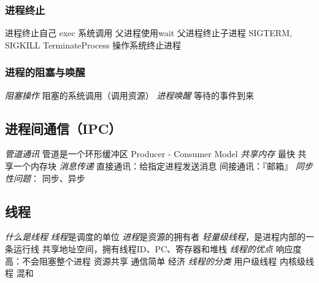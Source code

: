 \documentclass{ctexart}
\begin{document}
\subsubsection{进程终止}
\begin{outline}
    \1 进程终止自己 exec 系统调用
        \2 父进程使用wait
    \1 父进程终止子进程
        \2 SIGTERM, SIGKILL
        \2 TerminateProcess
    \1 操作系统终止进程
\end{outline}
\subsubsection{进程的阻塞与唤醒}
\begin{outline}
    \1 \emph{阻塞操作} 阻塞的系统调用（调用资源）
    \1 \emph{进程唤醒} 等待的事件到来
\end{outline}
\subsection{进程间通信（IPC）}
\begin{outline}
    \1 \emph{管道通讯}
        \2 管道是一个环形缓冲区
        \2 Producer - Consumer Model
    \1 \emph{共享内存}
        \2 最快
        \2 共享一个内存块
    \1 \emph{消息传递}
        \2 直接通讯：给指定进程发送消息
        \2 间接通讯：『邮箱』
    \1 \emph{同步性问题}： 同步、异步
\end{outline}
\subsection{线程}
\begin{outline}
    \1 \emph{什么是线程}
        \2 \emph{线程}是调度的单位
        \2 \emph{进程}是资源的拥有者
        \2 \emph{轻量级线程}，是进程内部的一条运行线
        \2 共享地址空间，拥有线程ID、PC、寄存器和堆栈
    \1 \emph{线程的优点}
        \2 响应度高：不会阻塞整个进程
        \2 资源共享
        \2 通信简单
        \2 经济
    \1 \emph{线程的分类}
        \2 用户级线程
        \2 内核级线程
        \2 混和
\end{outline}
\end{document}
